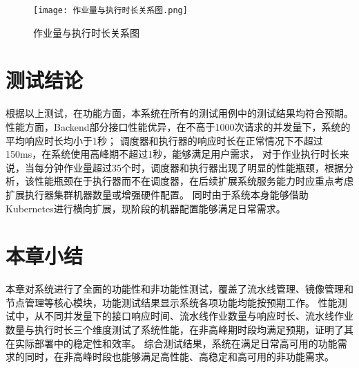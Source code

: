 \begin{figure}[h]
  \centering
  \texttt{[image: 作业量与执行时长关系图.png]}
  \caption{作业量与执行时长关系图}
  \label{fig:作业量与执行时长关系图}
\end{figure}

\section{测试结论}

根据以上测试，在功能方面，本系统在所有的测试用例中的测试结果均符合预期。性能方面，Backend部分接口性能优异，在不高于1000次请求的并发量下，系统的平均响应时长均小于1秒；
调度器和执行器的响应时长在正常情况下不超过150ms，在系统使用高峰期不超过1秒，能够满足用户需求，
对于作业执行时长来说，当每分钟作业量超过35个时，调度器和执行器出现了明显的性能瓶颈，根据分析，该性能瓶颈在于执行器而不在调度器，在后续扩展系统服务能力时应重点考虑扩展执行器集群机器数量或增强硬件配置。
同时由于系统本身能够借助Kubernetes进行横向扩展，现阶段的机器配置能够满足日常需求。


\section{本章小结}
本章对系统进行了全面的功能性和非功能性测试，覆盖了流水线管理、镜像管理和节点管理等核心模块，功能测试结果显示系统各项功能均能按预期工作。
性能测试中，从不同并发量下的接口响应时间、流水线作业数量与响应时长、流水线作业数量与执行时长三个维度测试了系统性能，在非高峰期时段均满足预期，证明了其在实际部署中的稳定性和效率。
综合测试结果，系统在满足日常高可用的功能需求的同时，在非高峰时段也能够满足高性能、高稳定和高可用的非功能需求。